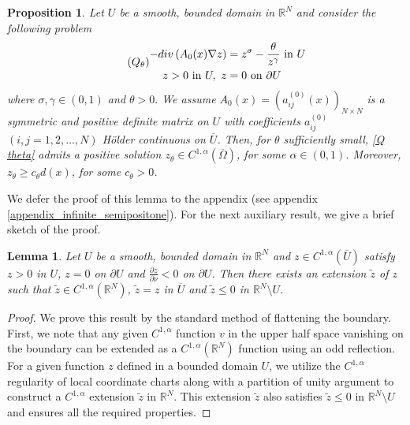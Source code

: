 \documentclass[reqno,oneside]{amsart}
\newtheorem{lemma}[theorem]{Lemma}
\newtheorem{proposition}[theorem]{Proposition}
\theoremstyle{definition}
\theoremstyle{remark}
\numberwithin{equation}{section}
\newcommand{\Om} {\Omega}
\newcommand{\sr}{\mathbb{R}}
\newcommand{\coa}{C^{1,\alpha}(\overline{\Om})}
\newcommand{\pa}{\partial}
\newcommand{\na} {\nabla}
\newcommand{\si}{\sigma}
\begin{document}
\begin{proposition}\label{infinite_semipositone_existence}
    Let $U$ be a smooth, bounded domain in $\sr^N$ and consider the following problem
    \begin{equation}\tag{$Q_{\theta}$}\label{Q theta}
    \begin{aligned}
        -div \left(A_0 (x) \na z \right) &= z^{\si} - \frac{\theta}{z^{\gamma}} \text{ in } U\\
        z > 0 \text{ in } U,\ z &= 0 \text{ on } \pa U
    \end{aligned}
    \end{equation}
    where $\sigma, \gamma \in (0,1)$ and $\theta>0.$ We assume $A_0 (x) =\left( a_{ij}^{(0)} (x) \right)_{N\times N}$ is a symmetric and positive definite matrix on $U$ with coefficients $a_{ij}^{(0)}$ $(i,j = 1,2, \dots, N)$ H\"older continuous on $\overline{U}$. Then, for $\theta$ sufficiently small, \eqref{Q theta} admits a positive solution $z_{\theta} \in \coa$, for some $\alpha\in (0,1)$. Moreover, $z_{\theta} \geq c_{\theta} d(x)$, for some $c_{\theta} >0$.
\end{proposition}

We defer the proof of this lemma to the appendix (see appendix \ref{appendix_infinite_semipositone}). For the next auxiliary result, we give a brief sketch of the proof.

\begin{lemma}\label{C_1_alpha extension}
    Let $U$ be a smooth, bounded domain in $\sr^N$ and $z\in C^{1,\alpha}(\overline{U})$ satisfy $z>0$ in $U$, $z=0$ on $\pa U$ and $\frac{\pa z}{\pa \nu} < 0$ on $\pa U$. Then there exists an extension $\tilde{z}$ of $z$ such that $\tilde{z} \in C^{1, \alpha} (\sr^N)$, $\tilde{z} =z$ in $\overline{U}$ and $\tilde{z} \leq 0$ in $\sr^N \setminus U$.
\end{lemma}

\begin{proof}
    We prove this result by the standard method of flattening the boundary. First, we note that any given $C^{1,\alpha}$ function $v$ in the upper half space vanishing on the boundary can be extended as a $C^{1,\alpha}(\mathbb{R}^N)$ function using an odd reflection. For a given function $z$ defined in a bounded domain $U$, we utilize the $C^{1,\alpha}$ regularity of local coordinate charts along with a partition of unity argument to construct a $C^{1,\alpha}$ extension $\tilde{z}$ in $\mathbb{R}^N$. This extension $\tilde{z}$ also satisfies $\tilde{z} \leq 0$ in $\mathbb{R}^N \setminus U$ and ensures all the required properties.
\end{proof}
\end{document}
